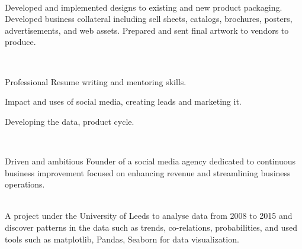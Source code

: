 \documentclass[a4paper]{MagicalCV}
\let\olditem\item
\renewcommand\item{\olditem\justifying}
\begin{document}
\begin{minipage}[t]{0.66\textwidth} 


 \\
\vspace{\topsep} %
\begin{tightemize}
\item Developed and implemented designs to existing and new product packaging. Developed business collateral including sell sheets, catalogs, brochures, posters, advertisements, and web assets. Prepared and sent final artwork to vendors to produce.
\end{tightemize}
\sectionsep

 \\
\vspace{\topsep}
\begin{tightemize}
\item Professional Resume writing and mentoring skills.
\item Impact and uses of social media, creating leads and marketing it.
\item Developing the data, product cycle.
\end{tightemize}
\sectionsep

 \\
\vspace{\topsep} %
\begin{tightemize}
\item Driven and ambitious Founder of a social media agency dedicated to continuous business improvement focused on enhancing revenue and streamlining business operations. 
\end{tightemize}
\sectionsep


 \\
 A project under the University of Leeds to analyse data from 2008 to 2015 and discover patterns in the data such as trends, co-relations, probabilities, and used tools such as matplotlib, Pandas, Seaborn for data visualization.
\sectionsep


\end{minipage}
\end{document}
